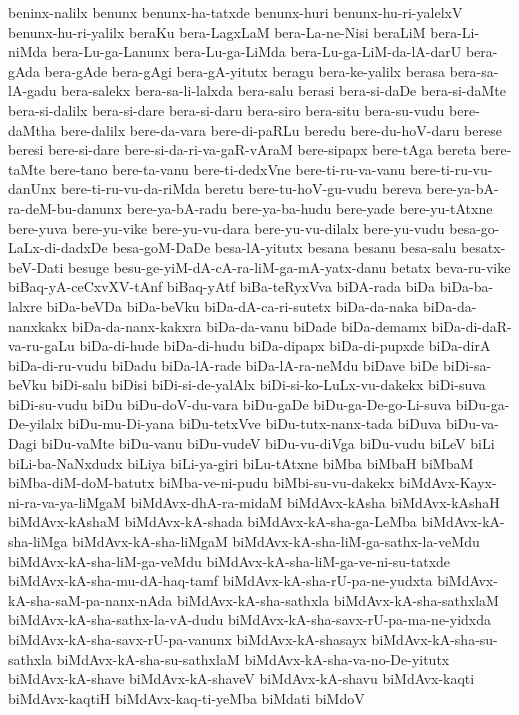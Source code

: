 {beninx-nalilx
benunx
benunx-ha-tatxde
benunx-huri
benunx-hu-ri-yalelxV
benunx-hu-ri-yalilx
beraKu
bera-LagxLaM
bera-La-ne-Nisi
beraLiM
bera-Li-niMda
bera-Lu-ga-Lanunx
bera-Lu-ga-LiMda
bera-Lu-ga-LiM-da-lA-darU
bera-gAda
bera-gAde
bera-gAgi
bera-gA-yitutx
beragu
bera-ke-yalilx
berasa
bera-sa-lA-gadu
bera-salekx
bera-sa-li-lalxda
bera-salu
berasi
bera-si-daDe
bera-si-daMte
bera-si-dalilx
bera-si-dare
bera-si-daru
bera-siro
bera-situ
bera-su-vudu
bere-daMtha
bere-dalilx
bere-da-vara
bere-di-paRLu
beredu
bere-du-hoV-daru
berese
beresi
bere-si-dare
bere-si-da-ri-va-gaR-vAraM
bere-sipapx
bere-tAga
bereta
bere-taMte
bere-tano
bere-ta-vanu
bere-ti-dedxVne
bere-ti-ru-va-vanu
bere-ti-ru-vu-danUnx
bere-ti-ru-vu-da-riMda
beretu
bere-tu-hoV-gu-vudu
bereva
bere-ya-bA-ra-deM-bu-danunx
bere-ya-bA-radu
bere-ya-ba-hudu
bere-yade
bere-yu-tAtxne
bere-yuva
bere-yu-vike
bere-yu-vu-dara
bere-yu-vu-dilalx
bere-yu-vudu
besa-go-LaLx-di-dadxDe
besa-goM-DaDe
besa-lA-yitutx
besana
besanu
besa-salu
besatx-beV-Dati
besuge
besu-ge-yiM-dA-cA-ra-liM-ga-mA-yatx-danu
betatx
beva-ru-vike
biBaq-yA-ceCxvXV-tAnf
biBaq-yAtf
biBa-teRyxVva
biDA-rada
biDa
biDa-ba-lalxre
biDa-beVDa
biDa-beVku
biDa-dA-ca-ri-sutetx
biDa-da-naka
biDa-da-nanxkakx
biDa-da-nanx-kakxra
biDa-da-vanu
biDade
biDa-demamx
biDa-di-daR-va-ru-gaLu
biDa-di-hude
biDa-di-hudu
biDa-dipapx
biDa-di-pupxde
biDa-dirA
biDa-di-ru-vudu
biDadu
biDa-lA-rade
biDa-lA-ra-neMdu
biDave
biDe
biDi-sa-beVku
biDi-salu
biDisi
biDi-si-de-yalAlx
biDi-si-ko-LuLx-vu-dakekx
biDi-suva
biDi-su-vudu
biDu
biDu-doV-du-vara
biDu-gaDe
biDu-ga-De-go-Li-suva
biDu-ga-De-yilalx
biDu-mu-Di-yana
biDu-tetxVve
biDu-tutx-nanx-tada
biDuva
biDu-va-Dagi
biDu-vaMte
biDu-vanu
biDu-vudeV
biDu-vu-diVga
biDu-vudu
biLeV
biLi
biLi-ba-NaNxdudx
biLiya
biLi-ya-giri
biLu-tAtxne
biMba
biMbaH
biMbaM
biMba-diM-doM-batutx
biMba-ve-ni-pudu
biMbi-su-vu-dakekx
biMdAvx-Kayx-ni-ra-va-ya-liMgaM
biMdAvx-dhA-ra-midaM
biMdAvx-kAsha
biMdAvx-kAshaH
biMdAvx-kAshaM
biMdAvx-kA-shada
biMdAvx-kA-sha-ga-LeMba
biMdAvx-kA-sha-liMga
biMdAvx-kA-sha-liMgaM
biMdAvx-kA-sha-liM-ga-sathx-la-veMdu
biMdAvx-kA-sha-liM-ga-veMdu
biMdAvx-kA-sha-liM-ga-ve-ni-su-tatxde
biMdAvx-kA-sha-mu-dA-haq-tamf
biMdAvx-kA-sha-rU-pa-ne-yudxta
biMdAvx-kA-sha-saM-pa-nanx-nAda
biMdAvx-kA-sha-sathxla
biMdAvx-kA-sha-sathxlaM
biMdAvx-kA-sha-sathx-la-vA-dudu
biMdAvx-kA-sha-savx-rU-pa-ma-ne-yidxda
biMdAvx-kA-sha-savx-rU-pa-vanunx
biMdAvx-kA-shasayx
biMdAvx-kA-sha-su-sathxla
biMdAvx-kA-sha-su-sathxlaM
biMdAvx-kA-sha-va-no-De-yitutx
biMdAvx-kA-shave
biMdAvx-kA-shaveV
biMdAvx-kA-shavu
biMdAvx-kaqti
biMdAvx-kaqtiH
biMdAvx-kaq-ti-yeMba
biMdati
biMdoV
}

